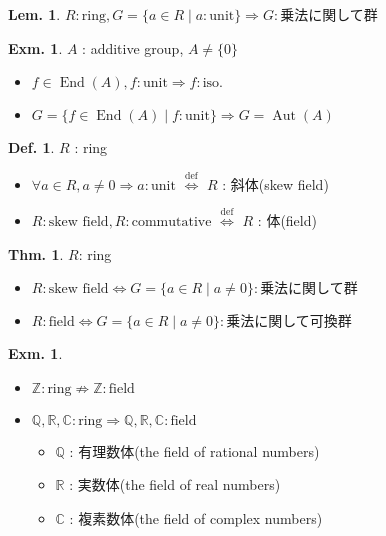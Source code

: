 \documentclass[uplatex,dvipdfmx,9pt]{beamer}
\newcommand{\defarrow}{\overset{\mathrm{def}}{\Leftrightarrow}}
\newcommand{\End}{\operatorname{End}}
\newcommand{\Aut}{\operatorname{Aut}}
\newcommand{\Z}{\mathbb{Z}}
\newcommand{\Q}{\mathbb{Q}}
\newcommand{\R}{\mathbb{R}}
\newcommand{\C}{\mathbb{C}}
\newcounter{textLemCount}
\newcounter{textExmCount}
\theoremstyle{definition} %
\newtheorem{defn}{Def.}[subsection] %
\newtheorem{thm}{Thm.}[subsection] %
\newtheorem{lemText}[textLemCount]{Lem.} %
\theoremstyle{example}
\newtheorem{exmText}[textExmCount]{Exm.}
\begin{document}
    \begin{frame}

      \begin{lemText}
        $R: \text{ring}, G = \{a \in R \mid a: \text{unit}\} \Rightarrow G: \text{乗法に関して群}$
      \end{lemText}

      \begin{exmText}
        $A$ : additive group, $A \ne \{0\}$
        \begin{itemize}
          \item $f \in \End(A), f: \text{unit} \Rightarrow f: \text{iso.}$
          \item $G = \{f \in \End(A) \mid f: \text{unit}\} \Rightarrow G = \Aut(A)$
        \end{itemize}
      \end{exmText}

      \begin{defn}
        $R$ : ring
        \begin{itemize}
          \item $\forall a \in R, a \ne 0 \Rightarrow a: \text{unit}$ $\defarrow$ $R$ : \alert{斜体(skew field)}
          \item $R: \text{skew field}, R : \text{commutative}$ $\defarrow$ $R$ : \alert{体(field)}
        \end{itemize}
      \end{defn}

    \end{frame}

    \begin{frame}

      \begin{thm}
        $R$: ring
        \begin{itemize}
          \item $R: \text{skew field} \Leftrightarrow G = \{a \in R \mid a \ne 0\} : \text{乗法に関して群}$
          \item $R: \text{field} \Leftrightarrow G = \{a \in R \mid a \ne 0\} : \text{乗法に関して可換群}$
        \end{itemize}
      \end{thm}
 
      \begin{exmText}
        \begin{itemize}
          \item $\Z : \text{ring} \nRightarrow \Z : \text{field}$
          \item $\Q, \R, \C : \text{ring} \Rightarrow \Q, \R, \C : \text{field}$
          \begin{itemize}
            \item $\Q$ : \alert{有理数体(the field of rational numbers)}
            \item $\R$ : \alert{実数体(the field of real numbers)}
            \item $\C$ : \alert{複素数体(the field of complex numbers)}
          \end{itemize}
        \end{itemize}
      \end{exmText}

    \end{frame}
\end{document}
